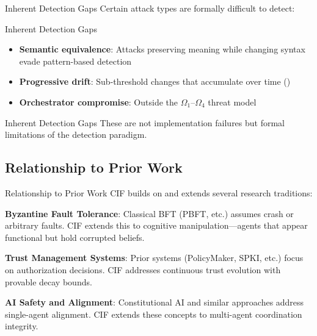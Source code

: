 \documentclass[
  ignorenonframetext,
]{beamer}
\providecommand{\tightlist}{%
  \setlength{\itemsep}{0pt}\setlength{\parskip}{0pt}}
\providecommand{\cref}[1]{\texttt{\detokenize{#1}}}
\begin{document}
\begin{frame}[allowframebreaks]{Inherent Detection Gaps}
\protect{}\label{inherent-detection-gaps}
Certain attack types are formally difficult to detect:

\end{frame}

\begin{frame}[allowframebreaks]{Inherent Detection Gaps}
\begin{itemize}
\tightlist
\item
  \textbf{Semantic equivalence}: Attacks preserving meaning while
  changing syntax evade pattern-based detection
\item
  \textbf{Progressive drift}: Sub-threshold changes that accumulate over
  time (\cref{eq:progressive-drift})
\item
  \textbf{Orchestrator compromise}: Outside the
  \(\Omega_1\)--\(\Omega_4\) threat model
\end{itemize}

\end{frame}

\begin{frame}[allowframebreaks]{Inherent Detection Gaps}
These are not implementation failures but formal limitations of the
detection paradigm.
\end{frame}

\subsection{Relationship to Prior Work}\label{sec:related-work}

\begin{frame}[allowframebreaks]{Relationship to Prior Work}
CIF builds on and extends several research traditions:

\textbf{Byzantine Fault Tolerance}: Classical BFT (PBFT, etc.) assumes
crash or arbitrary faults. CIF extends this to cognitive
manipulation---agents that appear functional but hold corrupted beliefs.

\textbf{Trust Management Systems}: Prior systems (PolicyMaker, SPKI,
etc.) focus on authorization decisions. CIF addresses continuous trust
evolution with provable decay bounds.

\textbf{AI Safety and Alignment}: Constitutional AI
\cite{bai2022constitutional} and similar approaches address single-agent
alignment. CIF extends these concepts to multi-agent coordination
integrity.

\end{frame}
\end{document}
